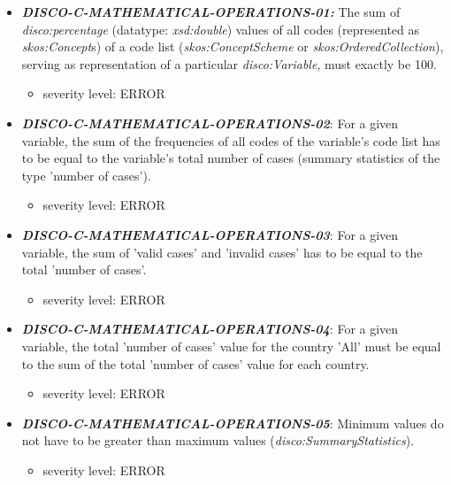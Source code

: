 \documentclass{llncs}
\begin{document}
\begin{itemize}
	\item \textbf{{\em DISCO-C-MATHEMATICAL-OPERATIONS-01:}}
  The sum of {\em disco:percentage} (datatype: {\em xsd:double}) values of all codes (represented as {\em skos:Concept}s) of a code list ({\em skos:ConceptScheme} or {\em skos:OrderedCollection}), serving as representation of a particular {\em disco:Variable}, must exactly be 100.
	\begin{itemize}
		\item severity level: ERROR
	\end{itemize}

	\item \textbf{{\em DISCO-C-MATHEMATICAL-OPERATIONS-02}}:
	For a given variable, the sum of the frequencies of all codes of the variable's code list has to be equal to the variable's total number of cases (summary statistics of the type 'number of cases').
	\begin{itemize}
		\item severity level: ERROR
	\end{itemize}
	
	\item \textbf{{\em DISCO-C-MATHEMATICAL-OPERATIONS-03}}:
	For a given variable, the sum of 'valid cases' and 'invalid cases' has to be equal to the total 'number of cases'.
	\begin{itemize}
		\item severity level: ERROR
	\end{itemize}
	
	\item \textbf{{\em DISCO-C-MATHEMATICAL-OPERATIONS-04}}:
	For a given variable, the total 'number of cases' value for the country 'All' must be equal to the sum of the total 'number of cases' value for each country.
	\begin{itemize}
		\item severity level: ERROR
	\end{itemize}
	
	\item \textbf{{\em DISCO-C-MATHEMATICAL-OPERATIONS-05}}:
	Minimum values do not have to be greater than maximum values (\emph{disco:SummaryStatistics}).
	\begin{itemize}
		\item severity level: ERROR
	\end{itemize}

\end{itemize}
\end{document}
